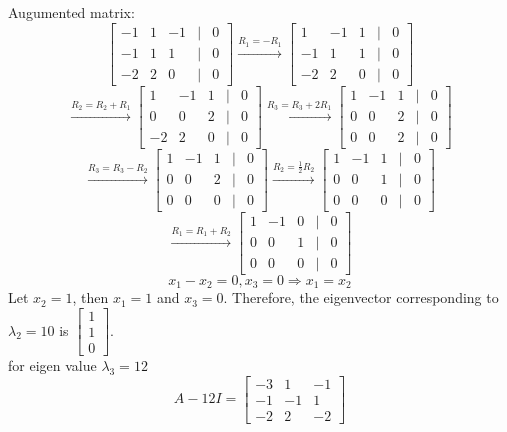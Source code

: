 \documentclass[12pt]{extarticle} %
\begin{document}
\begin{enumerate}
\[    \]
    Augumented matrix:
    \[
    \begin{bmatrix} -1 & 1 & -1 & | & 0\\ -1 & 1 & 1 & | & 0 \\ -2 & 2 & 0 & | & 0 \end{bmatrix} \xrightarrow{R_1 = -R_1} \begin{bmatrix} 1 & -1 & 1 & | & 0\\ -1 & 1 & 1 & | & 0 \\ -2 & 2 & 0 & | & 0 \end{bmatrix}
    \]
    \[
    \xrightarrow{R_2 = R_2 + R_1} \begin{bmatrix} 1 & -1 & 1 & | & 0\\ 0 & 0 & 2 & | & 0 \\ -2 & 2 & 0 & | & 0 \end{bmatrix} \xrightarrow{R_3 = R_3 + 2R_1} \begin{bmatrix} 1 & -1 & 1 & | & 0\\ 0 & 0 & 2 & | & 0 \\ 0 & 0 & 2 & | & 0 \end{bmatrix}
    \]
    \[
    \xrightarrow{R_3 = R_3 - R_2} \begin{bmatrix} 1 & -1 & 1 & | & 0\\ 0 & 0 & 2 & | & 0 \\ 0 & 0 & 0 & | & 0 \end{bmatrix} \xrightarrow{R_2 = \frac{1}{2}R_2} \begin{bmatrix} 1 & -1 & 1 & | & 0\\ 0 & 0 & 1 & | & 0 \\ 0 & 0 & 0 & | & 0 \end{bmatrix}
    \]
    \[
    \xrightarrow{R_1 = R_1 + R_2} \begin{bmatrix} 1 & -1 & 0 & | & 0\\ 0 & 0 & 1 & | & 0 \\ 0 & 0 & 0 & | & 0 \end{bmatrix}
    \]
    \[
    x_1 - x_2 = 0, x_3 = 0 \Rightarrow x_1 = x_2
    \]
    Let $x_2 = 1$, then $x_1 = 1$ and $x_3 = 0$. Therefore, the eigenvector corresponding to $\lambda_2 = 10$ is $\begin{bmatrix} 1 \\ 1 \\ 0 \end{bmatrix}$.
    \\ for eigen value $\lambda_3 = 12$
    \[
    A - 12I = \begin{bmatrix} -3 & 1 & -1\\ -1 & -1 & 1 \\ -2 & 2 & -2 \end{bmatrix}
\]
\end{enumerate}
\end{document}
